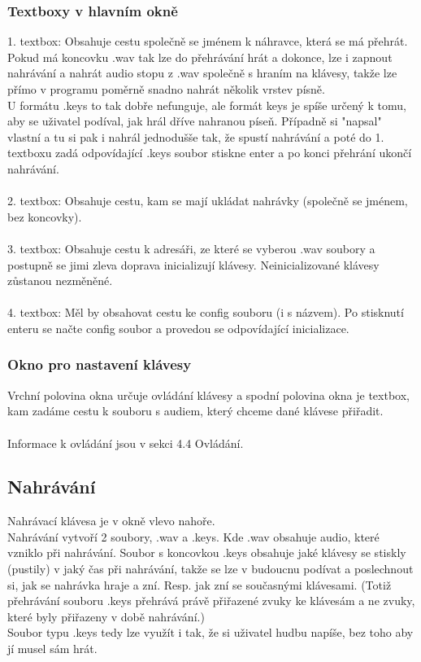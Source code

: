 \documentclass[12pt]{article}
\begin{document}
	\subsubsection{Textboxy v hlavním okně}
1. textbox: Obsahuje cestu společně se jménem k náhravce, která se má přehrát. Pokud má koncovku .wav tak lze do přehrávání hrát a dokonce, lze i zapnout nahrávání a nahrát audio stopu z .wav společně s hraním na klávesy, takže lze přímo v programu poměrně snadno nahrát několik vrstev písně.
\\
 U formátu .keys to tak dobře nefunguje, ale formát keys je spíše určený k tomu, aby se uživatel podíval, jak hrál dříve nahranou píseň. Případně si "napsal" vlastní a tu si pak i nahrál jednodušše tak, že spustí nahrávání a poté do 1. textboxu zadá odpovídající .keys soubor stiskne enter a po konci přehrání ukončí nahrávání. 
\\
\\
2. textbox: Obsahuje cestu, kam se mají ukládat nahrávky (společně se jménem, bez koncovky).
\\
\\
3. textbox: Obsahuje cestu k adresáři, ze které se vyberou .wav soubory a postupně se jimi zleva doprava inicializují klávesy. Neinicializované klávesy zůstanou nezměněné.
\\
\\
4. textbox: Měl by obsahovat cestu ke config souboru (i s názvem). Po stisknutí enteru se načte config soubor a provedou se odpovídající inicializace.

	\subsubsection{Okno pro nastavení klávesy} 
	Vrchní polovina okna určuje ovládání klávesy a spodní polovina okna je textbox, kam zadáme cestu k souboru s audiem, který chceme dané klávese přiřadit.
	\\
	\\
	Informace k ovládání jsou v sekci 4.4 Ovládání.
	
	\newpage
	\subsection{Nahrávání}
	Nahrávací klávesa je v okně vlevo nahoře.
	\\
	Nahrávání vytvoří 2 soubory, .wav a .keys. Kde .wav obsahuje audio, které vzniklo při nahrávání. Soubor s koncovkou .keys obsahuje jaké klávesy se stiskly (pustily) v jaký čas při nahrávání, takže se lze v budoucnu podívat a poslechnout si, jak se nahrávka hraje a zní. Resp. jak zní se současnými klávesami. (Totiž přehrávání souboru .keys přehrává právě přiřazené zvuky ke klávesám a ne zvuky, které byly přiřazeny v době nahrávání.)
	\\
	Soubor typu .keys tedy lze využít i tak, že si uživatel hudbu napíše, bez toho aby jí musel sám hrát. 
	 
\end{document}
